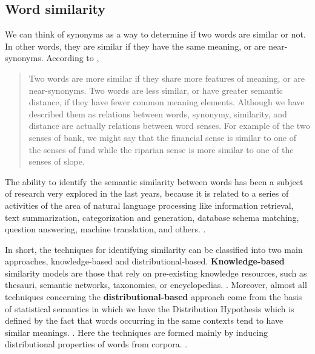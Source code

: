 

\subsection{Word similarity}

We can think of synonyms as a way to determine if two words are similar or not. In other words, they are similar if they have the same meaning, or are near-synonyms. According to ,

\begin{quote}
Two words are more similar if they share more features of meaning, or are near-synonyms. Two words are less similar, or have greater semantic distance, if they have fewer common meaning elements. Although we have described them as relations between words, synonymy, similarity, and distance are actually relations between word senses. For example of the two senses of bank, we might say that the financial sense is similar to one of the senses of fund while the riparian sense is more similar to one of the senses of slope.
\end{quote}


The ability to identify the semantic similarity between words has been a subject of research very explored in the last years, because it is related to a series of activities of the area of natural language processing like information retrieval, text summarization, categorization and generation, database schema matching, question answering, machine translation, and others. \cite{Islam2007ApplicationsOC, Jurafsky:2009:SLP:1214993}. 

In short, the techniques for identifying similarity can be classified into two main approaches, knowledge-based and distributional-based. \textbf{Knowledge-based} similarity models are those that rely on pre-existing knowledge resources, such as thesauri, semantic networks, taxonomies, or encyclopedias. \cite{Agirre2009}. Moreover, almost all techniques concerning the \textbf{distributional-based} approach come from the basis of statistical semantics in which we have the Distribution Hypothesis which is defined by the fact that words occurring in the same contexts tend to have similar meanings. \cite{Harris1954}. Here the techniques are formed mainly by inducing distributional properties of words from corpora. \cite{Agirre2009}.


